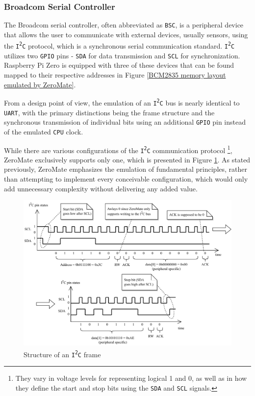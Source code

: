 \documentclass[english, ing, kiv, he, iso690numb, pdf]{fasthesis}
\begin{document}
	\subsubsection{Broadcom Serial Controller} \label{BSC}
	
	The Broadcom serial controller, often abbreviated as \texttt{BSC}, is a peripheral device that allows the user to communicate with external devices, usually sensors, using the \texttt{I\textsuperscript{2}C} protocol, which is a synchronous serial communication standard. \texttt{I\textsuperscript{2}C} utilizes two \texttt{GPIO} pins - \texttt{SDA} for data transmission and \texttt{SCL} for synchronization. Raspberry Pi Zero is equipped with three of these devices that can be found mapped to their respective addresses in Figure \ref{BCM2835 memory layout emulated by ZeroMate}.
	
	From a design point of view, the emulation of an \texttt{I\textsuperscript{2}C} bus is nearly identical to \texttt{UART}, with the primary distinctions being the frame structure and the synchronous transmission of individual bits using an additional \texttt{GPIO} pin instead of the emulated \texttt{CPU} clock.
	
	\begin{important}
		While there are various configurations of the \texttt{I\textsuperscript{2}C} communication protocol \footnote{They vary in voltage levels for representing logical 1 and 0, as well as in how they define the start and stop bits using the \texttt{SDA} and \texttt{SCL} signals.}, ZeroMate exclusively supports only one, which is presented in Figure \ref{Structure of an I2C frame}. As stated previously, ZeroMate emphasizes the emulation of fundamental principles, rather than attempting to implement every conceivable configuration, which would only add unnecessary complexity without delivering any added value.
	\end{important}
	
	\newpage
	
	\begin{figure}[ht]
		\centering
		\includegraphics[width=1.0\textwidth]{img/diagrams/bsc.pdf}
		\caption{Structure of an \texttt{I\textsuperscript{2}C} frame}
		\label{Structure of an I2C frame}
	\end{figure}
	
\end{document}
